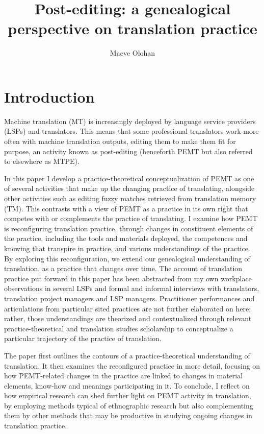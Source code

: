 \documentclass[output=paper,colorlinks,citecolor=brown]{langsci/langscibook}
\author{Maeve Olohan\affiliation{University of Manchester}}
\title{Post-editing: a genealogical perspective on translation practice}
\begin{document}
\maketitle
\section{Introduction}

Machine translation (MT) is increasingly deployed by language service providers (LSPs) and translators. This means that some professional translators work more often with machine translation outputs, editing them to make them fit for purpose, an activity known as post-editing (henceforth PEMT but also referred to elsewhere as MTPE). 

In this paper I develop a practice-theoretical conceptualization of PEMT as one of several activities that make up the changing practice of translating, alongside other activities such as editing fuzzy matches retrieved from translation memory (TM). This contrasts with a view of PEMT as a practice in its own right that competes with or complements the practice of translating. I examine how PEMT is reconfiguring translation practice, through changes in constituent elements of the practice, including the tools and materials deployed, the competences and knowing that transpire in practice, and various understandings of the practice. By exploring this reconfiguration, we extend our genealogical understanding of translation, as a practice that changes over time. 
The account of translation practice put forward in this paper has been abstracted from my own workplace observations in several LSPs and formal and informal interviews with translators, translation project managers and LSP managers. Practitioner performances and articulations from particular sited practices are not further elaborated on here; rather, those understandings are theorized and contextualized through relevant practice-theoretical and translation studies scholarship to conceptualize a particular trajectory of the practice of translation.

The paper first outlines the contours of a practice-theoretical understanding of translation. It then examines the reconfigured practice in more detail, focusing on how PEMT-related changes in the practice are linked to changes in material elements, know-how and meanings participating in it. To conclude, I reflect on how empirical research can shed further light on PEMT activity in translation, by employing methods typical of ethnographic research but also complementing them by other methods that may be productive in studying ongoing changes in translation practice. 
\end{document}
